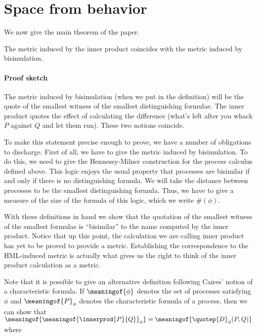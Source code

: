 \section{Space from behavior}

We now give the main theorem of the paper.

\begin{theorem}[main]
  The metric induced by the inner product coincides with the metric
  induced by bisimulation.
\end{theorem}

\paragraph{Proof sketch} The metric induced by bisimulation (when we
put in the definition) will be the quote of the smallest witness of
the smallest distinguishing formulae. The inner product quotes the
effect of calculating the difference (what's left after you whack $P$
against $Q$ and let them run). These two notions coincide.

To make this statement precise enough to prove, we have a number of
obligations to discharge. First of all, we have to give the metric
induced by bisimulation. To do this, we need to give the
Hennessy-Milner construction for the process calculus defined
above. This logic enjoys the usual property that processes are
bisimilar if and only if there is no distinguishing formula. We will
take the distance between processes to be the smallest distinguishing
formula. Thus, we have to give a measure of the size of the formula of
this logic, which we write $\#(\phi)$.

With these definitions in hand we show that the quotation of the
smallest witness of the smallest formulae is ``bisimilar'' to the name
computed by the inner product. Notice that up this point, the
calculation we are calling inner product has yet to be proved to
provide a metric. Establishing the correspondence to the HML-induced
metric is actually what gives us the right to think of the inner
product calculation as a metric.

Note that it is possible to give an alternative definition following
Caires' notion of a characteristic formula. If $\meaningof{\phi}$
denotes the set of processes satisfying $\phi$ and
$\meaningof{P}_{\phi}$ denotes the characteristic formula of a
process, then we can show that
$\meaningof{\meaningof{\innerprod{P}{Q}}_{\phi}} =
\meaningof{\quotep{D}_{\phi}(P,Q)}$ where

\begin{definition}[metric]  
\end{definition}

